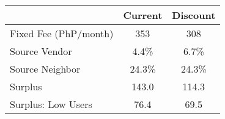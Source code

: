 \begin{tabular}{lcc}
\hline
& Current & Discount \\
\hline
\hline
Fixed Fee (PhP/month) &353&308\\
Source Vendor &4.4\% &6.7\% \\
Source Neighbor &24.3\% &24.3\% \\
 Surplus  &143.0&114.3 \\
 Surplus: Low Users  &76.4&69.5 \\
\hline
\end{tabular}
